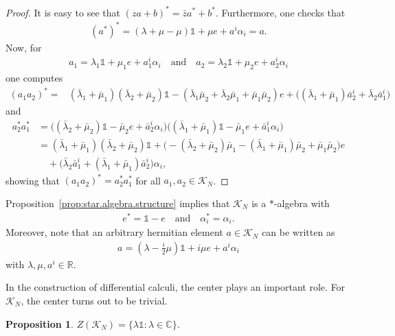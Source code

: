 \documentclass{amsart}
\newcommand{\reals}{\mathbb{R}}
\newcommand{\complex}{\mathbb{C}}
\newcommand{\paraa}[1]{\big(#1\big)}
\newcommand{\parab}[1]{\Big(#1\Big)}
\newtheorem{proposition}[theorem]{Proposition}
\theoremstyle{definition}
\theoremstyle{remark}
\numberwithin{equation}{section}
\newcommand{\K}{\mathcal{K}}
\renewcommand{\mid}{\mathds{1}}
\newcommand{\KN}{\K_N}
\newcommand{\qand}{\quad\text{and}\quad}
\newcommand{\lb}{\bar{\lambda}}
\newcommand{\mub}{\bar{\mu}}
\begin{document}
\begin{proof}
  It is easy to see that $(za+b)^\ast = \bar{z}a^\ast +
  b^\ast$. Furthermore, one checks that
  \begin{align*}
    (a^\ast)^\ast = (\lambda+\mu-\mu)\mid+\mu e+a^i\alpha_i = a.
  \end{align*}
  Now, for
  \begin{align*}
    a_1 = \lambda_1\mid + \mu_1e + a_1^i\alpha_i\quad\text{and}\quad
    a_2 = \lambda_2\mid + \mu_2e + a_2^i\alpha_i
  \end{align*}
  one computes
  \begin{align*}
    (a_1a_2)^\ast = &(\lb_1+\mub_1)(\lb_2+\mub_2)\mid
                      -(\lb_1\mub_2+\lb_2\mub_1+\mub_1\mub_2)e+\paraa{(\lb_1+\mub_1)\bar{a}_2^i+\lb_2\bar{a}_1^i}
  \end{align*}
  and
  \begin{align*}
    a_2^\ast a_1^\ast
    &= \parab{(\lb_2+\mub_2)\mid-\mub_2 e+\bar{a}_2^i\alpha_i}
    \parab{(\lb_1+\mub_1)\mid-\mub_1 e+\bar{a}_1^i\alpha_i}\\
    &=(\lb_1+\mub_1)(\lb_2+\mub_2)\mid
      +\paraa{-(\lb_2+\mub_2)\mub_1-(\lb_1+\mub_1)\mub_2+\mub_1\mub_2}e\\
    &\quad+\paraa{\lb_2\bar{a}_1^i+(\lb_1+\mub_1)\bar{a}_2^i}\alpha_i,
  \end{align*}
  showing that $(a_1a_2)^\ast=a_2^\ast a_1^\ast$ for all
  $a_1,a_2\in\KN$.
\end{proof}

\noindent
Proposition~\ref{prop:star.algebra.structure} implies that $\KN$ is a
$\ast$-algebra with
\begin{align*}
  e^\ast = \mid-e\qand \alpha_i^\ast = \alpha_i.
\end{align*}
Moreover, note that an arbitrary hermitian element $a\in\KN$ can be
written as
\begin{align*}
  a = (\lambda-\tfrac{i}{2}\mu)\mid+i\mu e+a^i\alpha_i
\end{align*}
with $\lambda,\mu,a^i\in\reals$.

In the construction of differential calculi, the center plays an
important role. For $\KN$, the center turns out to be trivial.

\begin{proposition}
  $Z(\KN) = \{\lambda\mid:\lambda\in\complex\}$.
\end{proposition}
\end{document}
